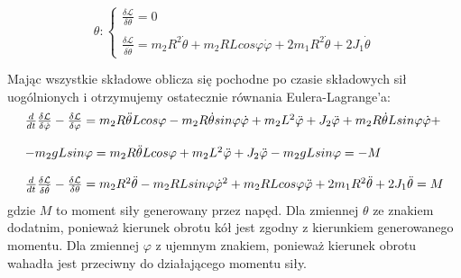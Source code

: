 $$
    \theta:
    \left\{
    \begin{array}{ll}
    \frac{\delta\mathcal{L}}{\delta\theta} = 0 \\ \\
    \frac{\delta\mathcal{L}}{\delta\dot{\theta}} = m_2R^2\dot{\theta} + m_2RLcos\varphi\dot{\varphi} + 2m_1R^2\dot{\theta} + 2J_1\dot{\theta} 
    \end{array}
    \right.
$$

Mając wszystkie składowe oblicza się pochodne po czasie składowych sił uogólnionych i otrzymujemy ostatecznie równania Eulera-Lagrange'a:
\begin{equation}
    \begin{array}{ll}
    \frac{d}{dt}\frac{\delta\mathcal{L}}{\delta\dot{\varphi}} - \frac{\delta\mathcal{L}}{\delta\varphi} = m_2R\Ddot{\theta}Lcos\varphi - m_2R\dot{\theta}sin\varphi\dot{\varphi} + m_2L^2\Ddot{\varphi} + J_2\Ddot{\varphi} + m_2R\dot{\theta}Lsin\varphi\dot{\varphi} + \\ \\
    - m_2gLsin\varphi = m_2R\Ddot{\theta}Lcos\varphi + m_2L^2\Ddot{\varphi} + J_2\Ddot{\varphi} - m_2gLsin\varphi = -M
    \\ \\
    \frac{d}{dt}\frac{\delta\mathcal{L}}{\delta\dot{\theta}} - \frac{\delta\mathcal{L}}{\delta\theta} = m_2R^2\Ddot{\theta} - m_2RLsin\varphi\dot{\varphi}^2 + m_2RLcos\varphi\Ddot{\varphi} + 2m_1R^2\Ddot{\theta} + 2J_1\Ddot{\theta} = M
    \end{array}
\end{equation}
%
gdzie $M$ to moment siły generowany przez napęd. Dla zmiennej $\theta$ ze znakiem dodatnim, ponieważ kierunek obrotu kół jest zgodny z kierunkiem generowanego momentu. Dla zmiennej $\varphi$ z ujemnym znakiem, ponieważ kierunek obrotu wahadła jest przeciwny do działającego momentu siły. 

